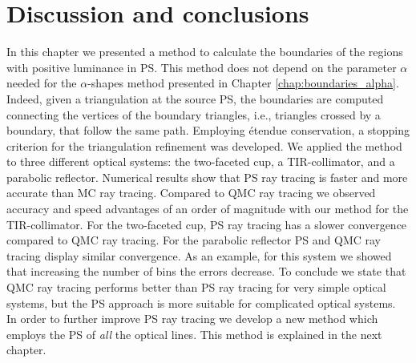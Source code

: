 \section{Discussion and conclusions}
In this chapter we presented a method to calculate the boundaries of the regions with positive luminance in PS. This method does not depend on the parameter $\alpha$ needed for the $\alpha$-shapes method presented in Chapter \ref{chap:boundaries_alpha}. Indeed, given a triangulation at the source PS, the boundaries are computed connecting the vertices of the boundary triangles, i.e., triangles crossed by a boundary, that follow the same path. Employing \'{e}tendue conservation, a stopping criterion for the triangulation refinement was developed. We applied the method to three different optical systems: the two-faceted cup, a TIR-collimator, and a parabolic reflector. Numerical results show that PS ray tracing is faster and more accurate than MC ray tracing. Compared to QMC ray tracing we observed accuracy and speed advantages of an order of magnitude with our method for the TIR-collimator. 
For the two-faceted cup, PS ray tracing has a slower convergence compared to QMC ray tracing. For the parabolic reflector PS and QMC ray tracing display similar convergence. As an example, for this system we showed that increasing the number of bins the errors decrease. 
To conclude we state that QMC ray tracing performs better than PS ray tracing for very simple optical systems, but the PS approach is more suitable for complicated optical systems.
\\ \indent In order to further improve PS ray tracing we develop a new method which employs the PS of \textit{all} the optical lines. This method is explained in the next chapter.









 

